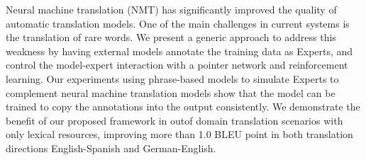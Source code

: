 Neural machine translation (NMT) has significantly improved the quality of automatic translation models. One of the main challenges in current systems is the translation of rare words. We present a generic approach to address this weakness by having external models annotate the training data as Experts, and control the model-expert interaction with a pointer network and reinforcement learning. Our experiments using phrase-based models to simulate Experts to complement neural machine translation models show that the model can be trained to copy the annotations into the output consistently. We demonstrate the benefit of our proposed framework in outof domain translation scenarios with only lexical resources, improving more than 1.0 BLEU point in both translation directions English-Spanish and German-English.
